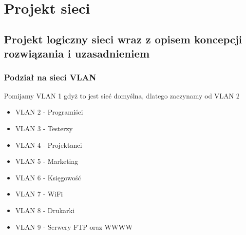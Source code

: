 \documentclass[a4paper,12pt]{extarticle}  %
\begin{document}
\section{Projekt sieci}
\subsection{Projekt logiczny sieci wraz z opisem koncepcji rozwiązania i uzasadnieniem}
\begin{figure}[H]
	\centering
\end{figure}
\cleardoublepage
\subsubsection{Podział na sieci VLAN}
Pomijamy VLAN 1 gdyż to jest sieć domyślna, dlatego zaczynamy od VLAN 2
\begin{itemize}
	\item VLAN 2 - Programiści
	\item VLAN 3 - Testerzy
	\item VLAN 4 - Projektanci
	\item VLAN 5 - Marketing
	\item VLAN 6 - Księgowość
	\item VLAN 7 - WiFi
	\item VLAN 8 - Drukarki
	\item VLAN 9 - Serwery FTP oraz WWWW
\end{itemize}
\end{document}
